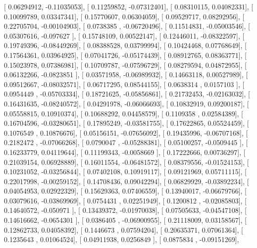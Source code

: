 \documentclass{article}
\begin{document}
       [ 0.06294912, -0.11035053],
       [ 0.11259852, -0.07312401],
       [ 0.08310115,  0.04082331],
       [ 0.10099789,  0.03347341],
       [ 0.15770607,  0.06304059],
       [ 0.09529717,  0.08292956],
       [ 0.22705704, -0.00104903],
       [ 0.0738385 , -0.06720496],
       [ 0.11514831, -0.05003546],
       [ 0.05307616, -0.097627  ],
       [ 0.15748109,  0.00522147],
       [ 0.12446011, -0.08322597],
       [ 0.19749396, -0.08449269],
       [ 0.08388528,  0.03799994],
       [ 0.10424468,  0.07768649],
       [ 0.17564361,  0.03964925],
       [ 0.07041726, -0.05174439],
       [ 0.08912765,  0.08363771],
       [ 0.15023978,  0.07386981],
       [ 0.10709787, -0.07596729],
       [ 0.08279594,  0.04872955],
       [ 0.06132266, -0.0823851 ],
       [ 0.03571958, -0.06989932],
       [ 0.14663118,  0.00527989],
       [ 0.09512667, -0.08032571],
       [ 0.06717295,  0.08544155],
       [ 0.0638314 ,  0.0157103 ],
       [ 0.0954449 , -0.05703334],
       [ 0.18721625, -0.05856861],
       [ 0.21732453, -0.02163032],
       [ 0.16431635, -0.08240572],
       [ 0.04291978, -0.06066693],
       [ 0.10832919,  0.09200187],
       [ 0.05558815,  0.10910374],
       [ 0.10688292,  0.04458579],
       [ 0.1109358 ,  0.02584389],
       [ 0.16704596, -0.03280651],
       [ 0.17895249, -0.03581755],
       [ 0.17622865,  0.05524459],
       [ 0.1076549 ,  0.10876676],
       [ 0.05156151, -0.07656092],
       [ 0.19435996, -0.06707168],
       [ 0.2182472 , -0.07066268],
       [ 0.0790047 , -0.05288381],
       [ 0.05100257, -0.0509445 ],
       [ 0.16233779,  0.04119644],
       [ 0.11199343, -0.0058669 ],
       [ 0.17222666,  0.00736297],
       [ 0.21039154,  0.06928889],
       [ 0.16011554, -0.06481572],
       [ 0.08379556, -0.01524153],
       [ 0.10231052, -0.03256844],
       [ 0.07402108,  0.10919117],
       [ 0.09121969,  0.05711115],
       [ 0.22017998, -0.00259152],
       [ 0.14708436,  0.09042294],
       [ 0.06829929, -0.03892234],
       [ 0.04054953,  0.02922329],
       [ 0.15629363,  0.07406559],
       [ 0.13940017, -0.06679766],
       [ 0.03079616, -0.03869969],
       [ 0.0754431 ,  0.02251949],
       [ 0.1200812 , -0.02085803],
       [ 0.14640572, -0.050971  ],
       [ 0.13439372, -0.01970038],
       [ 0.07505633, -0.04547108],
       [ 0.14616662, -0.0654301 ],
       [ 0.0386405 , -0.06900955],
       [ 0.21118009,  0.03158567],
       [ 0.12862733,  0.04058392],
       [ 0.1446673 ,  0.07594204],
       [ 0.20635371,  0.07061364],
       [ 0.1235643 ,  0.01064524],
       [ 0.04911938,  0.0256849 ],
       [ 0.0875834 , -0.09151269],
\end{document}
